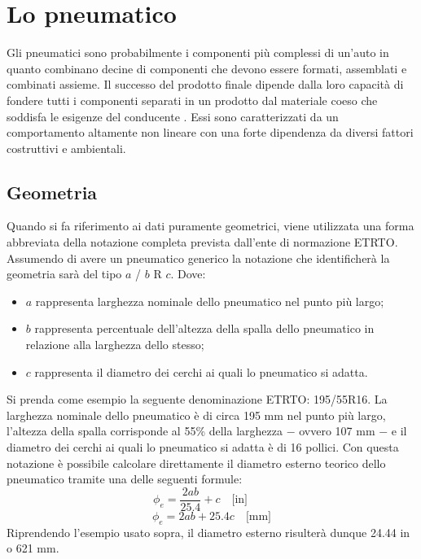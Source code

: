 \chapter{Lo pneumatico}
\label{Pneumatico}
%
Gli pneumatici sono probabilmente i componenti più complessi di un'auto in quanto combinano decine di componenti che devono essere formati, assemblati e combinati assieme. Il successo del prodotto finale dipende dalla loro capacità di fondere tutti i componenti separati in un prodotto dal materiale coeso che soddisfa le esigenze del conducente \cite{rill}. Essi sono caratterizzati da un comportamento altamente non lineare con una forte dipendenza da diversi fattori costruttivi e ambientali.
%
\section{Geometria}
Quando si fa riferimento ai dati puramente geometrici, viene utilizzata una forma abbreviata della notazione completa prevista dall'ente di normazione \ac{ETRTO}. Assumendo di avere un pneumatico generico la notazione che identificherà la geometria sarà del tipo $a$ / $b$ R $c$. Dove:
\begin{itemize}
	\item $a$ rappresenta larghezza nominale dello pneumatico nel punto più largo;
	\item $b$ rappresenta percentuale dell'altezza della spalla dello pneumatico in relazione alla larghezza dello stesso;
	\item $c$ rappresenta il diametro dei cerchi ai quali lo pneumatico si adatta.
\end{itemize}
Si prenda come esempio la seguente denominazione \ac{ETRTO}: 195/55R16. La larghezza nominale dello pneumatico è di circa 195 mm nel punto più largo, l'altezza della spalla corrisponde al 55\% della larghezza $-$ ovvero 107 mm $-$ e il diametro dei cerchi ai quali lo pneumatico si adatta è di 16 pollici. Con questa notazione è possibile calcolare direttamente il diametro esterno teorico dello pneumatico tramite una delle seguenti formule:
%
\begin{equation}
\phi_e = \frac{2ab}{25.4}+c \quad \text{[in]} \qquad
\end{equation}
\begin{equation}
\phi_e = 2ab+25.4c \quad \text{[mm]}
\end{equation}
%
Riprendendo l'esempio usato sopra, il diametro esterno risulterà dunque 24.44 in o 621 mm.\\
